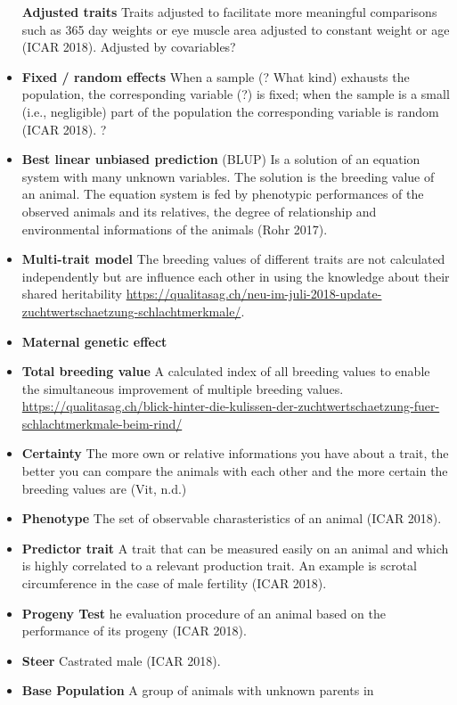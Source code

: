 \documentclass[]{article}
\begin{document}
\begin{itemize}
  \textbf{Adjusted traits} Traits adjusted to facilitate more meaningful
  comparisons such as 365 day weights or eye muscle area adjusted to
  constant weight or age (ICAR 2018). Adjusted by covariables?
\item
  \textbf{Fixed / random effects} When a sample (? What kind) exhausts
  the population, the corresponding variable (?) is fixed; when the
  sample is a small (i.e., negligible) part of the population the
  corresponding variable is random (ICAR 2018). ?
\item
  \textbf{Best linear unbiased prediction} (BLUP) Is a solution of an
  equation system with many unknown variables. The solution is the
  breeding value of an animal. The equation system is fed by phenotypic
  performances of the observed animals and its relatives, the degree of
  relationship and environmental informations of the animals (Rohr
  2017).
\item
  \textbf{Multi-trait model} The breeding values of different traits are
  not calculated independently but are influence each other in using the
  knowledge about their shared heritability
  \url{https://qualitasag.ch/neu-im-juli-2018-update-zuchtwertschaetzung-schlachtmerkmale/}.
\item
  \textbf{Maternal genetic effect}
\item
  \textbf{Total breeding value} A calculated index of all breeding
  values to enable the simultaneous improvement of multiple breeding
  values.
  \url{https://qualitasag.ch/blick-hinter-die-kulissen-der-zuchtwertschaetzung-fuer-schlachtmerkmale-beim-rind/}
\item
  \textbf{Certainty} The more own or relative informations you have
  about a trait, the better you can compare the animals with each other
  and the more certain the breeding values are (Vit, n.d.)
\item
  \textbf{Phenotype} The set of observable charasteristics of an animal
  (ICAR 2018).
\item
  \textbf{Predictor trait} A trait that can be measured easily on an
  animal and which is highly correlated to a relevant production trait.
  An example is scrotal circumference in the case of male fertility
  (ICAR 2018).
\item
  \textbf{Progeny Test} he evaluation procedure of an animal based on
  the performance of its progeny (ICAR 2018).
\item
  \textbf{Steer} Castrated male (ICAR 2018).
\item
  \textbf{Base Population} A group of animals with unknown parents in

\end{itemize}
\end{document}
